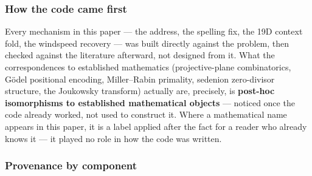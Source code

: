 \documentclass[
  10pt,
]{article}
\begin{document}
\hypertarget{how-the-code-came-first}{%
\subsubsection{How the code came first}\label{how-the-code-came-first}}

Every mechanism in this paper --- the address, the spelling fix, the 19D
context fold, the windspeed recovery --- was built directly against the
problem, then checked against the literature afterward, not designed
from it. What the correspondences to established mathematics
(projective-plane combinatorics, Gödel positional encoding,
Miller--Rabin primality, sedenion zero-divisor structure, the Joukowsky
transform) actually are, precisely, is \textbf{post-hoc isomorphisms to
established mathematical objects} --- noticed once the code already
worked, not used to construct it. Where a mathematical name appears in
this paper, it is a label applied after the fact for a reader who
already knows it --- it played no role in how the code was written.

\hypertarget{provenance-by-component}{%
\subsubsection{Provenance by component}\label{provenance-by-component}}
\end{document}
